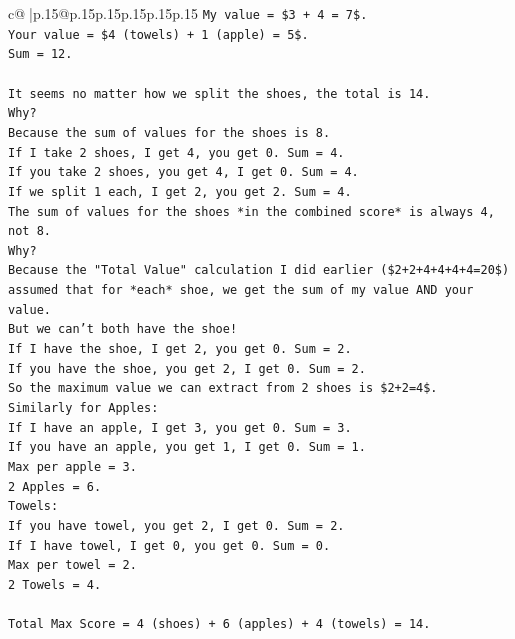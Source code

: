 \documentclass{article}
\begin{document}
{\begin{supertabular}{c@{$\;$}|p{.15\linewidth}@{}p{.15\linewidth}p{.15\linewidth}p{.15\linewidth}p{.15\linewidth}p{.15\linewidth}}
{{{\texttt{My value = \$3 + 4 = 7\$.} \\
\texttt{Your value = \$4 (towels) + 1 (apple) = 5\$.} \\
\texttt{Sum = 12.} \\
\\ 
\texttt{It seems no matter how we split the shoes, the total is 14.} \\
\texttt{Why?} \\
\texttt{Because the sum of values for the shoes is 8.} \\
\texttt{If I take 2 shoes, I get 4, you get 0. Sum = 4.} \\
\texttt{If you take 2 shoes, you get 4, I get 0. Sum = 4.} \\
\texttt{If we split 1 each, I get 2, you get 2. Sum = 4.} \\
\texttt{The sum of values for the shoes *in the combined score* is always 4, not 8.} \\
\texttt{Why?} \\
\texttt{Because the "Total Value" calculation I did earlier (\$2+2+4+4+4+4=20\$) assumed that for *each* shoe, we get the sum of my value AND your value.} \\
\texttt{But we can't both have the shoe!} \\
\texttt{If I have the shoe, I get 2, you get 0. Sum = 2.} \\
\texttt{If you have the shoe, you get 2, I get 0. Sum = 2.} \\
\texttt{So the maximum value we can extract from 2 shoes is \$2+2=4\$.} \\
\texttt{Similarly for Apples:} \\
\texttt{If I have an apple, I get 3, you get 0. Sum = 3.} \\
\texttt{If you have an apple, you get 1, I get 0. Sum = 1.} \\
\texttt{Max per apple = 3.} \\
\texttt{2 Apples = 6.} \\
\texttt{Towels:} \\
\texttt{If you have towel, you get 2, I get 0. Sum = 2.} \\
\texttt{If I have towel, I get 0, you get 0. Sum = 0.} \\
\texttt{Max per towel = 2.} \\
\texttt{2 Towels = 4.} \\
\\ 
\texttt{Total Max Score = 4 (shoes) + 6 (apples) + 4 (towels) = 14.} \\
}}}
\end{supertabular}}
\end{document}
